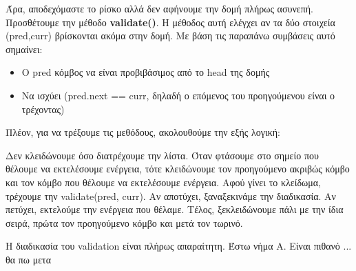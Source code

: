 \documentclass[../final_report.tex]{subfiles}
\begin{document}
Άρα, αποδεχόμαστε το ρίσκο αλλά δεν αφήνουμε την δομή πλήρως ασυνεπή. Προσθέτουμε την μέθοδο \textbf{validate()}. 
Η μέθοδος αυτή ελέγχει αν τα δύο στοιχεία (pred,curr) βρίσκονται ακόμα στην δομή. 
Με βάση τις παραπάνω συμβάσεις αυτό σημαίνει:

\begin{itemize}
    \item O pred κόμβος να είναι προβιβάσιμος από το head της δομής
    \item Να ισχύει (pred.next == curr, δηλαδή ο επόμενος του προηγούμενου είναι ο τρέχοντας)
\end{itemize}

Πλέον, για να τρέξουμε τις μεθόδους, ακολουθούμε την εξής λογική:

Δεν κλειδώνουμε όσο διατρέχουμε την λίστα. Όταν φτάσουμε στο σημείο που θέλουμε να εκτελέσουμε ενέργεια, τότε κλειδώνουμε
τον προηγούμενο ακριβώς κόμβο και τον κόμβο που θέλουμε να εκτελέσουμε ενέργεια. Αφού γίνει το κλείδωμα, τρέχουμε την validate(pred, curr).
Αν αποτύχει, ξαναξεκινάμε την διαδικασία. Αν πετύχει, εκτελούμε την ενέργεια που θέλαμε. Τέλος, ξεκλειδώνουμε πάλι με την ίδια σειρά, πρώτα 
τον προηγούμενο κόμβο και μετά τον τωρινό. 

Η διαδικασία του validation είναι πλήρως απαραίτητη. Έστω νήμα Α. Είναι πιθανό
... θα πω μετα
\end{document}
